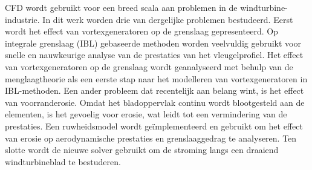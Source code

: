 {CFD wordt gebruikt voor een breed scala aan problemen in de windturbine-industrie. In dit werk worden drie van dergelijke problemen bestudeerd. Eerst wordt het effect van vortexgeneratoren op de grenslaag gepresenteerd. Op integrale grenslaag (IBL) gebaseerde methoden worden veelvuldig gebruikt voor snelle en nauwkeurige analyse van de prestaties van het vleugelprofiel. Het effect van vortexgeneratoren op de grenslaag wordt geanalyseerd met behulp van de menglaagtheorie als een eerste stap naar het modelleren van vortexgeneratoren in IBL-methoden. Een ander probleem dat recentelijk aan belang wint, is het effect van voorranderosie. Omdat het bladoppervlak continu wordt blootgesteld aan de elementen, is het gevoelig voor erosie, wat leidt tot een vermindering van de prestaties. Een ruwheidsmodel wordt geïmplementeerd en gebruikt om het effect van erosie op aerodynamische prestaties en grenslaaggedrag te analyseren. Ten slotte wordt de nieuwe solver gebruikt om de stroming langs een draaiend windturbineblad te bestuderen.

}

